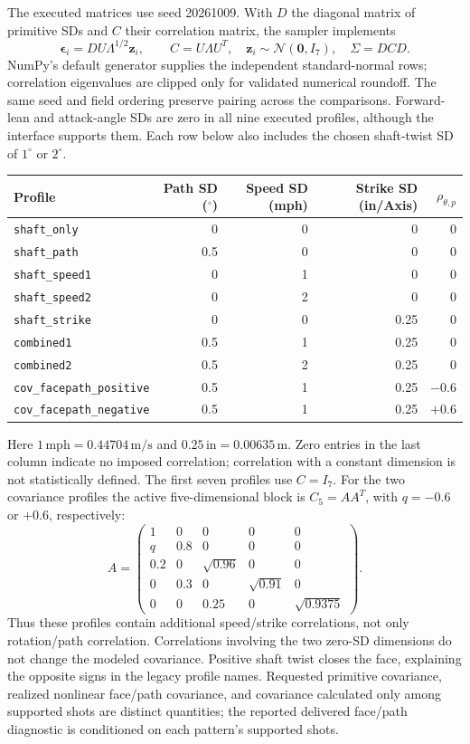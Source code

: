 \documentclass[11pt,letterpaper]{article}
\begin{document}
The executed matrices use seed 20261009. With $D$ the diagonal matrix of
primitive SDs and $C$ their correlation matrix, the sampler implements
\[
 \boldsymbol\epsilon_i=D U\Lambda^{1/2}\mathbf z_i,\qquad
 C=U\Lambda U^T,\quad \mathbf z_i\sim\mathcal N(\mathbf0,I_7),\quad
 \Sigma=DCD.
\]
NumPy's default generator supplies the independent standard-normal rows;
correlation eigenvalues are clipped only for validated numerical roundoff.
The same seed and field ordering preserve pairing across the comparisons.
Forward-lean and attack-angle SDs are zero in all nine executed profiles,
although the interface supports them. Each row below also includes the chosen
shaft-twist SD of $1^\circ$ or $2^\circ$.
\begin{center}\small
\begin{tabular}{lrrrr}
\toprule
Profile & Path SD ($^\circ$) & Speed SD (mph) & Strike SD (in/Axis) & $\rho_{\theta,p}$\\
\midrule
\texttt{shaft\_only} & 0 & 0 & 0 & 0\\
\texttt{shaft\_path} & 0.5 & 0 & 0 & 0\\
\texttt{shaft\_speed1} & 0 & 1 & 0 & 0\\
\texttt{shaft\_speed2} & 0 & 2 & 0 & 0\\
\texttt{shaft\_strike} & 0 & 0 & 0.25 & 0\\
\texttt{combined1} & 0.5 & 1 & 0.25 & 0\\
\texttt{combined2} & 0.5 & 2 & 0.25 & 0\\
\texttt{cov\_facepath\_positive} & 0.5 & 1 & 0.25 & $-0.6$\\
\texttt{cov\_facepath\_negative} & 0.5 & 1 & 0.25 & $+0.6$\\
\bottomrule
\end{tabular}
\end{center}
Here $1\,\mathrm{mph}=0.44704\,\mathrm{m/s}$ and
$0.25\,\mathrm{in}=0.00635\,\mathrm m$. Zero entries in the last column
indicate no imposed correlation; correlation with a constant dimension is
not statistically defined. The first seven profiles use $C=I_7$.
For the two covariance profiles the active five-dimensional block is
$C_5=AA^T$, with $q=-0.6$ or $+0.6$, respectively:
\[
 A=\begin{pmatrix}
 1&0&0&0&0\\
 q&0.8&0&0&0\\
 0.2&0&\sqrt{0.96}&0&0\\
 0&0.3&0&\sqrt{0.91}&0\\
 0&0&0.25&0&\sqrt{0.9375}
 \end{pmatrix}.
\]
Thus these profiles contain additional speed/strike correlations, not only
rotation/path correlation. Correlations involving the two zero-SD dimensions
do not change the modeled covariance. Positive shaft twist closes the face,
explaining the opposite signs in the legacy profile names. Requested primitive
covariance, realized nonlinear face/path covariance, and covariance calculated
only among supported shots are distinct quantities; the reported delivered
face/path diagnostic is conditioned on each pattern's supported shots.
\end{document}
